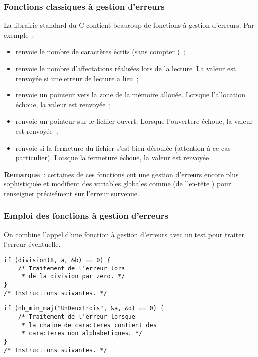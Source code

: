 \begin{frame} \frametitle{Fonctions classiques à gestion d'erreurs}
La librairie standard du {\sf C} contient beaucoup de fonctions à
gestion d'erreurs. Par exemple~:

\begin{itemize} \small
    \item {} renvoie le nombre de caractères écrits (sans 
    compter )~;
    \smallskip
    
    \item {} renvoie le nombre d'affectations réalisées lors 
    de la lecture. La valeur  est renvoyée si une erreur de 
    lecture a lieu~;
    \smallskip
    
    \item {} renvoie un pointeur vers la zone de la mémoire 
    allouée. Lorsque l'allocation échoue, la valeur  est 
    renvoyée~;
    \smallskip
    
    \item {} renvoie un pointeur sur le fichier ouvert. 
    Lorsque l'ouverture échoue,  la valeur  est renvoyée~;
    \smallskip
    
    \item {} renvoie  si la fermeture du fichier 
    s'est bien déroulée (attention à ce cas particulier). Lorsque 
    la fermeture échoue, la valeur  est renvoyée.
\end{itemize}

{\bf Remarque}~: certaines de ces fonctions ont une gestion d'erreurs
encore plus sophistiquée et modifient des variables globales 
comme  (de l'en-tête ) pour renseigner 
précisément sur l'erreur survenue.
\end{frame}

\begin{frame}[fragile] \frametitle{Emploi des fonctions à gestion d'erreurs}
On combine l'appel d'une fonction à gestion d'erreurs avec un test pour 
traiter l'erreur éventuelle.
\begin{lstlisting}
if (division(8, a, &b) == 0) {
    /* Traitement de l'erreur lors
     * de la division par zero. */
}
/* Instructions suivantes. */
\end{lstlisting}

\begin{lstlisting}
if (nb_min_maj("UnDeuxTrois", &a, &b) == 0) {
    /* Traitement de l'erreur lorsque
     * la chaine de caracteres contient des 
     * caracteres non alphabetiques. */
}
/* Instructions suivantes. */
\end{lstlisting}
\end{frame}

